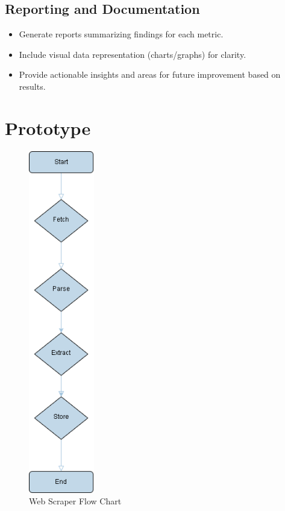 \subsection{Reporting and Documentation}
\begin{itemize}
    \item Generate reports summarizing findings for each metric.
    \item Include visual data representation (charts/graphs) for clarity.
    \item Provide actionable insights and areas for future improvement based on results.
\end{itemize}

\section{Prototype}
\begin{figure}
    \centering
    \includegraphics[height=15cm]{Figures/Web Scraper FlowChart.png} %
    \caption{Web Scraper Flow Chart}
    \label{fig:enter-label}
\end{figure}


